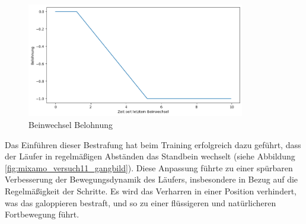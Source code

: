 \begin{figure}[H]
  \centering
  \includegraphics[width=0.85\textwidth]{img/plot_beinwechsel} 
  \caption{Beinwechsel Belohnung}
  \label{fig:plot_beinwechsel}
\end{figure}

Das Einführen dieser Bestrafung hat beim Training erfolgreich dazu geführt, dass der Läufer in regelmäßigen Abständen das Standbein wechselt (siehe Abbildung \ref{fig:mixamo_versuch11_gangbild}). Diese Anpassung führte zu einer spürbaren Verbesserung der Bewegungsdynamik des Läufers, insbesondere in Bezug auf die Regelmäßigkeit der Schritte. Es wird das Verharren in einer Position verhindert, was das galoppieren bestraft, und so zu einer flüssigeren und natürlicheren Fortbewegung führt.

